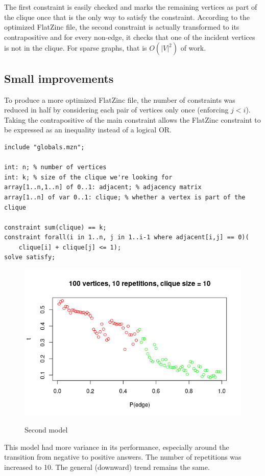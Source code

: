 \documentclass{article}
\theoremstyle{definition}
\begin{document}
The first constraint is easily checked and marks the remaining vertices as part of the clique once that is the only way to satisfy the constraint. According to the optimized FlatZinc file, the second constraint is actually transformed to its contrapositive and for every non-edge, it checks that one of the incident vertices is not in the clique. For sparse graphs, that is $O(|V|^2)$ of work.
\subsection{Small improvements}
To produce a more optimized FlatZinc file, the number of constraints was reduced in half by considering each pair of vertices only once (enforcing $j<i$). Taking the contrapositive of the main constraint allows the FlatZinc constraint to be expressed as an inequality instead of a logical OR.
\begin{lstlisting}
include "globals.mzn";

int: n; % number of vertices
int: k; % size of the clique we're looking for
array[1..n,1..n] of 0..1: adjacent; % adjacency matrix
array[1..n] of var 0..1: clique; % whether a vertex is part of the clique

constraint sum(clique) == k;
constraint forall(i in 1..n, j in 1..i-1 where adjacent[i,j] == 0)(
    clique[i] + clique[j] <= 1);
solve satisfy;
\end{lstlisting}
\begin{figure}
  \includegraphics[scale=0.5]{max_clique2.png}
  \label{fig:second_max_clique}
  \caption{Second model}
\end{figure}
This model had more variance in its performance, especially around the transition from negative to positive answers. The number of repetitions was increased to 10. The general (downward) trend remains the same.
\end{document}
